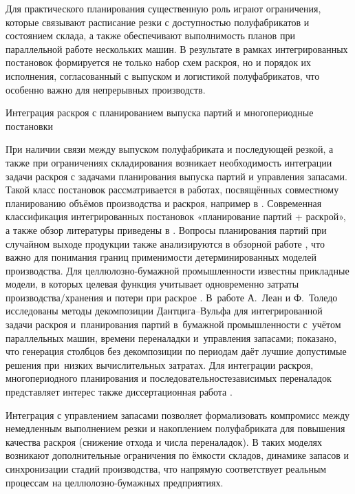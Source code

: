 Для практического планирования существенную роль играют ограничения, которые связывают расписание резки с доступностью полуфабрикатов и состоянием склада, а также обеспечивают выполнимость планов при параллельной работе нескольких машин.
В результате в рамках интегрированных постановок формируется не только набор схем раскроя, но и порядок их исполнения, согласованный с выпуском и логистикой полуфабрикатов, что особенно важно для непрерывных производств.

{Интеграция раскроя с планированием выпуска партий и многопериодные постановки}\label{subsec:theor_ch/integration_lotsizing}

При наличии связи между выпуском полуфабриката и последующей резкой, а также при ограничениях складирования возникает необходимость интеграции задачи раскроя с задачами планирования выпуска партий и управления запасами.
Такой класс постановок рассматривается в работах, посвящённых совместному планированию объёмов производства и раскроя, например в \cite{nonas2000combined, quadt2004_lotsizing_flexflow, katok2005_lotsizing_assembly}.
Современная классификация интегрированных постановок «планирование партий + раскрой», а также обзор литературы приведены в \cite{melega2018review}.
Вопросы планирования партий при случайном выходе продукции также анализируются в обзорной работе \cite{yano1989_random_yields_review}, что важно для понимания границ применимости детерминированных моделей производства.
Для целлюлозно-бумажной промышленности известны прикладные модели, в которых целевая функция учитывает одновременно затраты производства/хранения и потери при раскрое \cite{poltroniere2016tema}.
В~работе А.~Леан и Ф.~Толедо \cite{leao2016decomposition} исследованы методы декомпозиции Дантцига–Вульфа для интегрированной задачи раскроя и~планирования партий в~бумажной промышленности с~учётом параллельных машин, времени переналадки и~управления запасами; показано, что генерация столбцов без декомпозиции по периодам даёт лучшие допустимые решения при~низких вычислительных затратах.
Для интеграции раскроя, многопериодного планирования и последовательностезависимых переналадок представляет интерес также диссертационная работа \cite{ditri1994_cutstock_scheduling_thesis}.

Интеграция с управлением запасами позволяет формализовать компромисс между немедленным выполнением резки и накоплением полуфабриката для повышения качества раскроя (снижение отхода и числа переналадок).
В таких моделях возникают дополнительные ограничения по ёмкости складов, динамике запасов и синхронизации стадий производства, что напрямую соответствует реальным процессам на целлюлозно-бумажных предприятиях.

